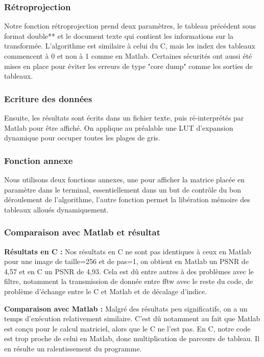 \documentclass[conference]{IEEEtran}
\begin{document}
\subsubsection{Rétroprojection }

Notre fonction rétroprojection prend deux paramètres, le tableau précédent sous format double** et le document texte qui contient les informations sur la transformée.
L'algorithme est similaire à celui du C, mais les index des tableaux commencent à 0 et non à 1 comme en Matlab. Certaines sécurités ont aussi été mises en place pour éviter les erreurs de type "core dump" comme les sorties de tableaux.


\subsubsection{Ecriture des données }

Ensuite, les résultats sont écrits dans un fichier texte, puis ré-interprétés par Matlab pour être affiché. On applique au préalable une LUT d'expansion dynamique pour occuper toutes les plages de gris.

\subsubsection{Fonction annexe }

Nous utilisons deux fonctions annexes, une pour afficher la matrice placée en paramètre dans le terminal, essentiellement dans un but de contrôle du bon déroulement de l'algorithme, l'autre fonction permet la libération mémoire des tableaux alloués dynamiquement.

\subsubsection{Comparaison avec Matlab et résultat }

\textbf{Résultats en C : }
Nos résultats en C ne sont pas identiques à ceux en Matlab pour une image de taille=256 et de pas=1, on obtient en Matlab un PSNR de 4,57 et en C un PSNR de 4,93. Cela est dû entre autres à des problèmes avec le filtre, notamment la transmission de donnée entre fftw avec le reste du code, de problème d'échange entre le C et Matlab et de décalage d'indice.

\textbf{Comparaison avec Matlab : }
Malgré des résultats peu significatifs, on a un temps d'exécution relativement similaire. C'est dû notamment au fait que Matlab est conçu pour le calcul matriciel, alors que le C ne l'est pas. En C, notre code est trop proche de celui en Matlab, donc multiplication de parcours de tableau. Il en résulte un ralentissement du programme. 
\end{document}
